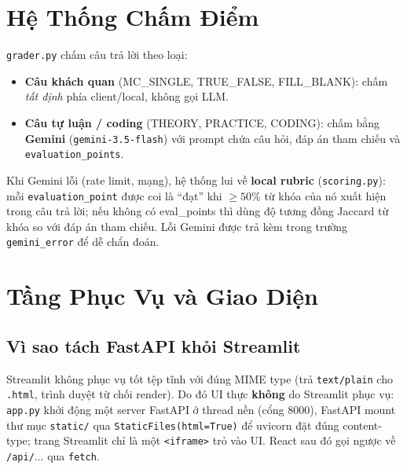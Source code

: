 \documentclass[12pt, a4paper]{report}
\begin{document}
\section{Hệ Thống Chấm Điểm}
\label{sec:grading}

\texttt{grader.py} chấm câu trả lời theo loại:
\begin{itemize}[leftmargin=1.3em]
  \item \textbf{Câu khách quan} (MC\_SINGLE, TRUE\_FALSE, FILL\_BLANK): chấm \textit{tất định} phía client/local, không gọi LLM.
  \item \textbf{Câu tự luận / coding} (THEORY, PRACTICE, CODING): chấm bằng \textbf{Gemini} (\texttt{gemini-3.5-flash}) với prompt chứa câu hỏi, đáp án tham chiếu và \texttt{evaluation\_points}.
\end{itemize}
Khi Gemini lỗi (rate limit, mạng), hệ thống lui về \textbf{local rubric} (\texttt{scoring.py}): mỗi \texttt{evaluation\_point} được coi là ``đạt'' khi $\geq 50\%$ từ khóa của nó xuất hiện trong câu trả lời; nếu không có eval\_points thì dùng độ tương đồng Jaccard từ khóa so với đáp án tham chiếu. Lỗi Gemini được trả kèm trong trường \texttt{gemini\_error} để dễ chẩn đoán.

\section{Tầng Phục Vụ và Giao Diện}
\label{sec:serving}

\subsection{Vì sao tách FastAPI khỏi Streamlit}
Streamlit không phục vụ tốt tệp tĩnh với đúng MIME type (trả \texttt{text/plain} cho \texttt{.html}, trình duyệt từ chối render). Do đó UI thực \textbf{không} do Streamlit phục vụ: \texttt{app.py} khởi động một server FastAPI ở thread nền (cổng 8000), FastAPI mount thư mục \texttt{static/} qua \texttt{StaticFiles(html=True)} để uvicorn đặt đúng content-type; trang Streamlit chỉ là một \texttt{<iframe>} trỏ vào UI. React sau đó gọi ngược về \texttt{/api/$\ldots$} qua \texttt{fetch}.
\end{document}

